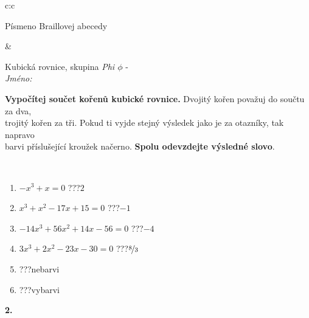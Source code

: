\documentclass[10pt]{report}
\begin{document}
\begin{tabular}{c:c}
\begin{minipage}[c][104.5mm][t]{0.5\linewidth}
\begin{center}
\begin{minipage}{0.20\linewidth}
\begin{center}
{\small Písmeno Braillovej abecedy}
\end{center}
\end{minipage}
\end{center}
\end{minipage}
&
\begin{minipage}[c][104.5mm][t]{0.5\linewidth}
\begin{center}
\vspace{7mm}
{\huge Kubická rovnice, skupina \textit{Phi $\phi$} -}\\[5mm]
\textit{Jméno:}\phantom{xxxxxxxxxxxxxxxxxxxxxxxxxxxxxxxxxxxxxxxxxxxxxxxxxxxxxxxxxxxxxxxxx}\\[5mm]
\begin{minipage}{0.95\linewidth}
\begin{center}
\textbf{Vypočítej součet kořenů kubické rovnice.} Dvojitý kořen považuj do součtu za dva,\\trojitý kořen za tři. Pokud ti vyjde stejný výsledek jako je za otazníky, tak napravo\\barvi příslušející kroužek načerno. \textbf{Spolu odevzdejte výsledné slovo}.
\end{center}
\end{minipage}
\\[1mm]
\begin{minipage}{0.79\linewidth}
\begin{center}
\begin{varwidth}{\linewidth}
\begin{enumerate}
\Large
\item $-x^3+x=0$\quad \dotfill\; ???\;\dotfill \quad $2$
\item $x^3+x^2-17x+15=0$\quad \dotfill\; ???\;\dotfill \quad $-1$
\item $-14x^3+56x^2+14x-56=0$\quad \dotfill\; ???\;\dotfill \quad $-4$
\item $3x^3+2x^2-23x-30=0$\quad \dotfill\; ???\;\dotfill \quad $\nicefrac{8}{3}$
\item \quad \dotfill\; ???\;\dotfill \quad nebarvi
\item \quad \dotfill\; ???\;\dotfill \quad vybarvi
\end{enumerate}
\end{varwidth}
\end{center}
\end{minipage}
\begin{minipage}{0.20\linewidth}
\begin{center}
{\Huge\bfseries 2.} \\[2mm]

\end{center}
\end{minipage}
\end{center}
\end{minipage}
\end{tabular}
\end{document}
